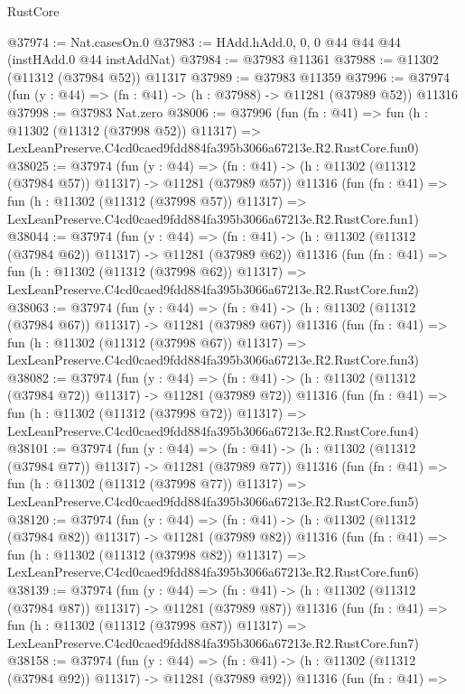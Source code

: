 \begin{lexlean}{RustCore}
\begin{coremodule}
@37974 := Nat.casesOn.{0}
@37983 := HAdd.hAdd.{0, 0, 0} @44 @44 @44 (instHAdd.{0} @44 instAddNat)
@37984 := @37983 @11361
@37988 := @11302 (@11312 (@37984 @52)) @11317
@37989 := @37983 @11359
@37996 := @37974 (fun (y : @44) => (fn : @41) -> (h : @37988) -> @11281 (@37989 @52)) @11316
@37998 := @37983 Nat.zero
@38006 := @37996
    (fun (fn : @41) =>
    fun (h : @11302 (@11312 (@37998 @52)) @11317) =>
    LexLeanPreserve.C4cd0caed9fdd884fa395b3066a67213e.R2.RustCore.fun0)
@38025 := @37974
    (fun (y : @44) =>
    (fn : @41) -> (h : @11302 (@11312 (@37984 @57)) @11317) -> @11281 (@37989 @57))
    @11316
    (fun (fn : @41) =>
    fun (h : @11302 (@11312 (@37998 @57)) @11317) =>
    LexLeanPreserve.C4cd0caed9fdd884fa395b3066a67213e.R2.RustCore.fun1)
@38044 := @37974
    (fun (y : @44) =>
    (fn : @41) -> (h : @11302 (@11312 (@37984 @62)) @11317) -> @11281 (@37989 @62))
    @11316
    (fun (fn : @41) =>
    fun (h : @11302 (@11312 (@37998 @62)) @11317) =>
    LexLeanPreserve.C4cd0caed9fdd884fa395b3066a67213e.R2.RustCore.fun2)
@38063 := @37974
    (fun (y : @44) =>
    (fn : @41) -> (h : @11302 (@11312 (@37984 @67)) @11317) -> @11281 (@37989 @67))
    @11316
    (fun (fn : @41) =>
    fun (h : @11302 (@11312 (@37998 @67)) @11317) =>
    LexLeanPreserve.C4cd0caed9fdd884fa395b3066a67213e.R2.RustCore.fun3)
@38082 := @37974
    (fun (y : @44) =>
    (fn : @41) -> (h : @11302 (@11312 (@37984 @72)) @11317) -> @11281 (@37989 @72))
    @11316
    (fun (fn : @41) =>
    fun (h : @11302 (@11312 (@37998 @72)) @11317) =>
    LexLeanPreserve.C4cd0caed9fdd884fa395b3066a67213e.R2.RustCore.fun4)
@38101 := @37974
    (fun (y : @44) =>
    (fn : @41) -> (h : @11302 (@11312 (@37984 @77)) @11317) -> @11281 (@37989 @77))
    @11316
    (fun (fn : @41) =>
    fun (h : @11302 (@11312 (@37998 @77)) @11317) =>
    LexLeanPreserve.C4cd0caed9fdd884fa395b3066a67213e.R2.RustCore.fun5)
@38120 := @37974
    (fun (y : @44) =>
    (fn : @41) -> (h : @11302 (@11312 (@37984 @82)) @11317) -> @11281 (@37989 @82))
    @11316
    (fun (fn : @41) =>
    fun (h : @11302 (@11312 (@37998 @82)) @11317) =>
    LexLeanPreserve.C4cd0caed9fdd884fa395b3066a67213e.R2.RustCore.fun6)
@38139 := @37974
    (fun (y : @44) =>
    (fn : @41) -> (h : @11302 (@11312 (@37984 @87)) @11317) -> @11281 (@37989 @87))
    @11316
    (fun (fn : @41) =>
    fun (h : @11302 (@11312 (@37998 @87)) @11317) =>
    LexLeanPreserve.C4cd0caed9fdd884fa395b3066a67213e.R2.RustCore.fun7)
@38158 := @37974
    (fun (y : @44) =>
    (fn : @41) -> (h : @11302 (@11312 (@37984 @92)) @11317) -> @11281 (@37989 @92))
    @11316
    (fun (fn : @41) =>

\end{coremodule}
\end{lexlean}
